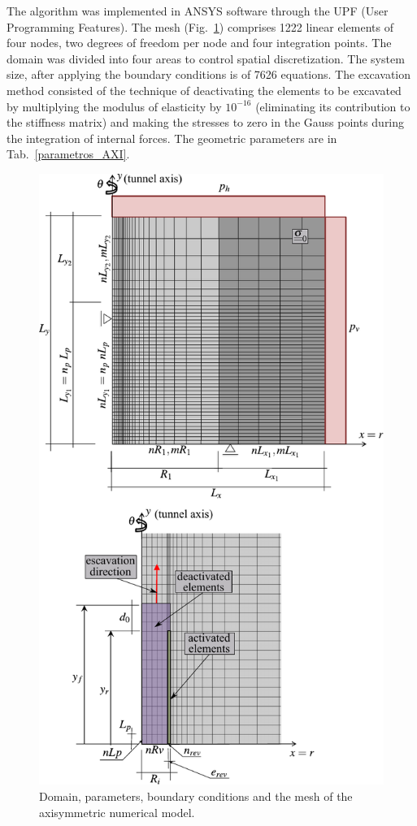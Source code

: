 \documentclass[Journal,letterpaper]{ascelike-new}
\begin{document}
The algorithm was implemented in ANSYS software through the UPF (User Programming Features). The mesh (Fig.~\ref{malhaAXI}) comprises 1222 linear elements of four nodes, two degrees of freedom per node and four integration points. The domain was divided into four areas to control spatial discretization. The system size, after applying the boundary conditions is of 7626 equations. The excavation method consisted of the technique of deactivating the elements to be excavated by multiplying the modulus of elasticity by $10^{-16}$ (eliminating its contribution to the stiffness matrix) and making the stresses to zero in the Gauss points during the integration of internal forces. The geometric parameters are in Tab.~\ref{parametros_AXI}.

\begin{figure}
	\centering
	\includegraphics[scale = 1.0]{malhaAXI.pdf}
	\caption{\label{malhaAXI}Domain, parameters, boundary conditions and the mesh of the axisymmetric numerical model.}
\end{figure}
\end{document}
